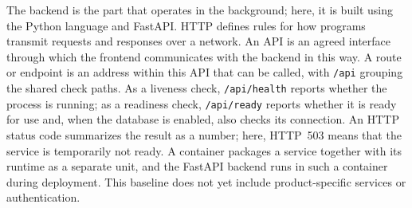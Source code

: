 \begin{beginnerstatement}

The backend is the part that operates in the background; here, it is built using
the Python language and FastAPI. HTTP defines rules for how programs
transmit requests and responses over a network. An API is an agreed interface
through which the frontend communicates with the backend in this way.
A route or endpoint is an address within this API that can be called, with
\texttt{/api} grouping the shared check paths. As a liveness check,
\texttt{/api/health} reports whether the process is running; as a readiness
check, \texttt{/api/ready} reports whether it is ready for use and, when the
database is enabled, also checks its connection. An HTTP status code summarizes
the result as a number; here, HTTP~503 means that the service is temporarily not
ready. A container packages a service together with its runtime as a separate
unit, and the FastAPI backend runs in such a container during deployment. This
baseline does not yet include product-specific services or authentication.

\end{beginnerstatement}
